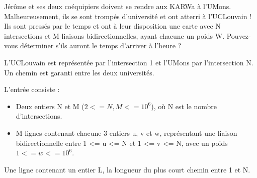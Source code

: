 \problemname{\problemyamlname}



Jérôme et ses deux coéquipiers doivent se rendre aux KARWa à l'UMons. Malheureusement, ils se sont trompés d'université et ont atterri à l'UCLouvain !
Ils sont pressés par le temps et ont à leur disposition une carte avec N intersections et M liaisons bidirectionnelles, ayant chacune un poids W.
Pouvez-vous déterminer s'ils auront le temps d'arriver à l'heure ?

L'UCLouvain est représentée par l'intersection 1 et l'UMons par l'intersection N. Un chemin est garanti entre les deux universités.

\begin{Input}
    L'entrée consiste :
    \begin{itemize}
        \item Deux entiers N et M ($2 <= N, M <= 10^6$), où N est le nombre d'intersections.
        \item  M lignes contenant chacune 3 entiers u, v et w, représentant une liaison bidirectionnelle entre 1 <= u <= N et 1 <= v <= N, avec un poids $1 <= w <= 10^6$.
    \end{itemize}
\end{Input}

\begin{Output}
    Une ligne contenant un entier L, la longueur du plus court chemin entre 1 et N.
\end{Output}
